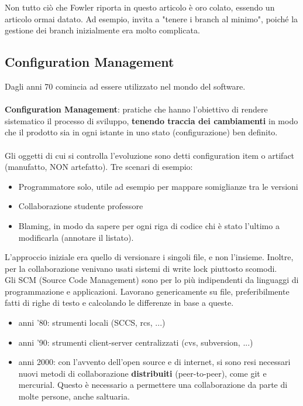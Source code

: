 \noindent Non tutto ciò che Fowler riporta in questo articolo è oro colato, essendo un articolo ormai datato. Ad esempio, invita a "tenere i branch al minimo", poiché la gestione dei branch inizialmente era molto complicata. 

\subsection{Configuration Management}
\noindent Dagli anni 70 comincia ad essere utilizzato nel mondo del software.
\\\\
\textbf{Configuration Management}: pratiche che hanno l'obiettivo di rendere sistematico il processo di sviluppo, \textbf{tenendo traccia dei cambiamenti} in modo che il prodotto sia in ogni istante in uno stato (configurazione) ben definito.
\\\\
Gli oggetti di cui si controlla l’evoluzione sono detti configuration item o artifact (manufatto, NON artefatto). Tre scenari di esempio:
\begin{itemize}
    \item Programmatore solo, utile ad esempio per mappare somiglianze tra le versioni
    \item Collaborazione studente professore
    \item Blaming, in modo da sapere per ogni riga di codice chi è stato l'ultimo a modificarla (annotare il listato).
\end{itemize}
L'approccio iniziale era quello di versionare i singoli file, e non l'insieme. Inoltre, per la collaborazione venivano usati sistemi di write lock piuttosto scomodi.
\\
Gli SCM (Source Code Management) sono per lo più indipendenti da linguaggi di programmazione e applicazioni. Lavorano genericamente su file, preferibilmente fatti di righe di testo e calcolando le differenze in base a queste.
\begin{itemize}
    \item anni '80: strumenti locali  (SCCS, rcs, ...)
    \item anni '90: strumenti client-server centralizzati (cvs, subversion, ...)
    \item anni 2000: con l'avvento dell'open source e di internet, si sono resi necessari nuovi metodi di collaborazione \textbf{distribuiti} (peer-to-peer), come git e mercurial. Questo è necessario a permettere una collaborazione da parte di molte persone, anche saltuaria.
\end{itemize}

